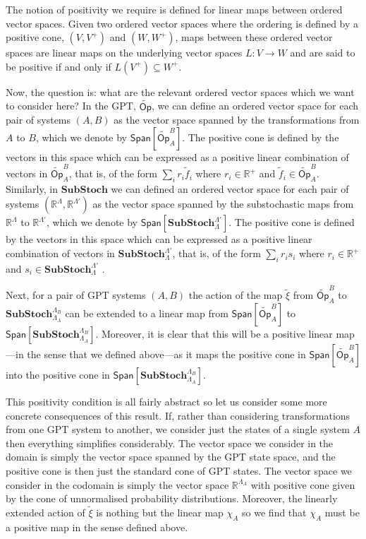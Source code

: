 \documentclass[onecolum,aps,groupedaddress,nofootinbib]{revtex4-2}
\newcommand\Op{\mathsf{Op}}
\begin{document}
 The notion of positivity we require is defined for linear maps between ordered vector spaces. Given two ordered vector spaces where the ordering is defined by a positive cone, $(V,V^+)$ and $(W,W^+)$, maps between these ordered vector spaces are  linear maps on the underlying vector spaces $L:V\to W$ and are said to be positive if and only if $L(V^+)\subseteq W^+$.

Now, the question is: what are the relevant ordered vector spaces which we want to consider here? In the GPT, $\widetilde{\Op}$, we can define an ordered vector space for each pair of systems $(A,B)$ as the vector space spanned by the transformations from $A$ to $B$, which we denote by $\mathsf{Span}[\widetilde{\Op}_A^B]$. The positive cone is defined by the vectors in this space which can be expressed as a positive linear combination of vectors in $\widetilde{\Op}_A^B$, that is, of the form $\sum_i r_i \widetilde{f}_i$ where $r_i \in \mathds{R}^+$ and $\widetilde{f}_i \in \widetilde{\Op}_A^B$. Similarly, in $\mathbf{SubStoch}$ we can defined an ordered vector space for each pair of systems $(\mathds{R}^\Lambda, \mathds{R}^{\Lambda'})$ as the vector space spanned by the substochastic maps from $\mathds{R}^\Lambda$ to $\mathds{R}^{\Lambda'}$, which we denote by $\mathsf{Span}[\mathbf{SubStoch}_\Lambda^{\Lambda'}]$. The positive cone is defined by the vectors in this space which can be expressed as a positive linear combination of vectors in $\mathbf{SubStoch}_\Lambda^{\Lambda'}$, that is, of the form $\sum_i r_i s_i$ where $r_i \in \mathds{R}^+$ and $s_i \in \mathbf{SubStoch}_\Lambda^{\Lambda'}$ .

Next, for a pair of GPT systems $(A,B)$ the action of the map $\widetilde{\xi}$ from $\widetilde{\Op}_A^B$ to $\mathbf{SubStoch}_{\Lambda_A}^{\Lambda_B}$ can be extended to a linear map from $\mathsf{Span}[\widetilde{\Op}_A^B]$ to $\mathsf{Span}[\mathbf{SubStoch}_{\Lambda_A}^{\Lambda_B}]$. Moreover, it is clear that this will be a positive linear map---in the sense that we defined above---as it maps the positive cone in $\mathsf{Span}[\widetilde{\Op}_A^B]$  into the positive cone in $\mathsf{Span}[\mathbf{SubStoch}_{\Lambda_A}^{\Lambda_B}]$.

This positivity condition is all fairly abstract so let us consider some more concrete consequences of this result. If, rather than considering transformations from one GPT system to another, we consider just the states of a single system $A$ then everything simplifies considerably. The vector space we consider in the domain is simply the vector space spanned by the GPT state space, and the positive cone is then just the standard cone of GPT states. The vector space we consider in the codomain is simply the vector space $\mathds{R}^{\Lambda_A}$ with positive cone given by the cone of unnormalised probability distributions. Moreover, the linearly extended action of $\widetilde{\xi}$ is nothing but the linear map $\chi_A$ so we find that $\chi_A$ must be a positive map in the sense defined above.
\end{document}
